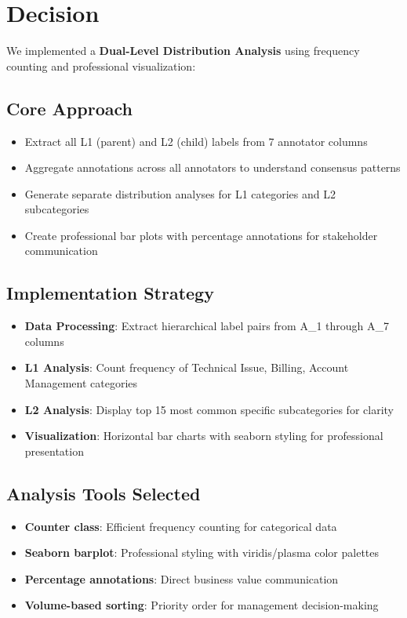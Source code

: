 \documentclass[11pt]{article}
\begin{document}
\section{Decision}

We implemented a \textbf{Dual-Level Distribution Analysis} using frequency counting and professional visualization:

\subsection{Core Approach}
\begin{itemize}
\item Extract all L1 (parent) and L2 (child) labels from 7 annotator columns
\item Aggregate annotations across all annotators to understand consensus patterns
\item Generate separate distribution analyses for L1 categories and L2 subcategories
\item Create professional bar plots with percentage annotations for stakeholder communication
\end{itemize}

\subsection{Implementation Strategy}
\begin{itemize}
\item \textbf{Data Processing}: Extract hierarchical label pairs from A\_1 through A\_7 columns
\item \textbf{L1 Analysis}: Count frequency of Technical Issue, Billing, Account Management categories
\item \textbf{L2 Analysis}: Display top 15 most common specific subcategories for clarity
\item \textbf{Visualization}: Horizontal bar charts with seaborn styling for professional presentation
\end{itemize}

\subsection{Analysis Tools Selected}
\begin{itemize}
\item \textbf{Counter class}: Efficient frequency counting for categorical data
\item \textbf{Seaborn barplot}: Professional styling with viridis/plasma color palettes
\item \textbf{Percentage annotations}: Direct business value communication
\item \textbf{Volume-based sorting}: Priority order for management decision-making
\end{itemize}
\end{document}
